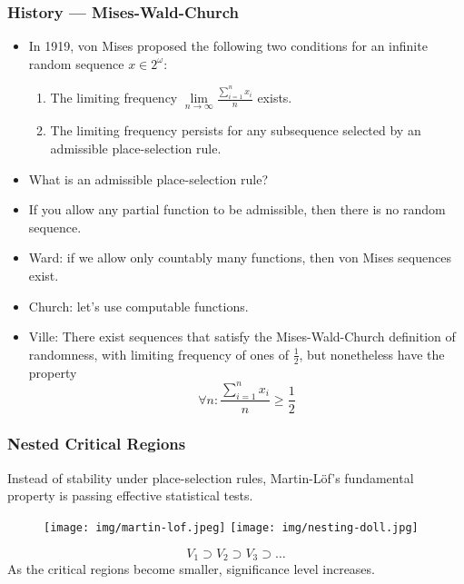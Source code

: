 \documentclass[UTF8,11pt,colorlinks,compress,openany]{beamer}%
\begin{document}
\begin{frame}\frametitle{History --- Mises-Wald-Church}
\begin{itemize}
\item In 1919, von Mises proposed the following two conditions for an infinite random sequence $x\in 2^\omega$:
\begin{enumerate}
	\item The limiting frequency $\lim\limits_{n\to\infty}\frac{\sum_{i=1}^n x_i}{n}$ exists.
	\item The limiting frequency persists for any subsequence selected by an admissible place-selection rule.
\end{enumerate}
\item What is an admissible place-selection rule?
\item If you allow any partial function to be admissible, then there is no random sequence.
\item Ward: if we allow only countably many functions, then von Mises sequences exist.
\item Church: let's use computable functions.
\item Ville: There exist sequences that satisfy the Mises-Wald-Church definition of randomness, with limiting frequency of ones of $\frac{1}{2}$, but nonetheless have the property
\[\forall n: \frac{\sum_{i=1}^nx_i}{n}\geq\frac{1}{2}\]
\end{itemize}
\end{frame}

\begin{frame}\frametitle{Nested Critical Regions}
Instead of stability under place-selection rules, Martin-L\"of's fundamental property is passing effective statistical tests.
\begin{figure}[H]
\texttt{[image: img/martin-lof.jpeg]}
\texttt{[image: img/nesting-doll.jpg]}
\end{figure}
\[V_1\supset V_2\supset V_3\supset\dots\]
As the critical regions become smaller, significance level increases.
\end{frame}
\end{document}
